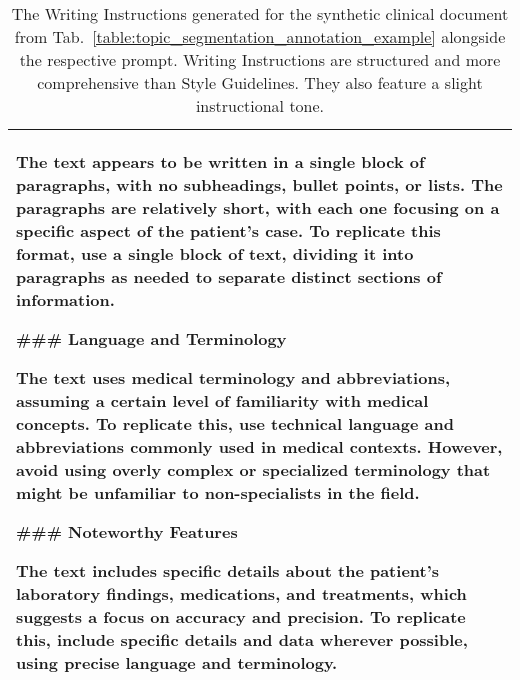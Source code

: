 \begin{table*}[ht]
{\begin{tabular}{p{}}
The text appears to be written in a single block of paragraphs, with no subheadings, bullet points, or lists. The paragraphs are relatively short, with each one focusing on a specific aspect of the patient's case. To replicate this format, use a single block of text, dividing it into paragraphs as needed to separate distinct sections of information.

\textbf{\#\#\# Language and Terminology}

The text uses medical terminology and abbreviations, assuming a certain level of familiarity with medical concepts. To replicate this, use technical language and abbreviations commonly used in medical contexts. However, avoid using overly complex or specialized terminology that might be unfamiliar to non-specialists in the field.

\textbf{\#\#\# Noteworthy Features}

The text includes specific details about the patient's laboratory findings, medications, and treatments, which suggests a focus on accuracy and precision. To replicate this, include specific details and data wherever possible, using precise language and terminology.\\
\hline
\end{tabular}
}

\caption{The Writing Instructions generated for the synthetic clinical document from Tab.~\ref{table:topic_segmentation_annotation_example} alongside the respective prompt. Writing Instructions are structured and more comprehensive than Style Guidelines. They also feature a slight instructional tone.}
\label{table:writing_instructions_example}
\end{table*}